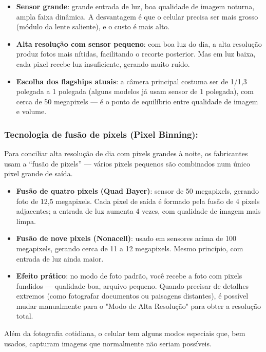 \begin{itemize}
  \item \textbf{Sensor grande}: grande entrada de luz, boa qualidade de imagem noturna, ampla faixa dinâmica. A desvantagem é que o celular precisa ser mais grosso (módulo da lente saliente), e o custo é mais alto.
  \item \textbf{Alta resolução com sensor pequeno}: com boa luz do dia, a alta resolução produz fotos mais nítidas, facilitando o recorte posterior. Mas em luz baixa, cada pixel recebe luz insuficiente, gerando muito ruído.
  \item \textbf{Escolha dos flagships atuais}: a câmera principal costuma ser de 1/1,3 polegada a 1 polegada (alguns modelos já usam sensor de 1 polegada), com cerca de 50 megapixels — é o ponto de equilíbrio entre qualidade de imagem e volume.
\end{itemize}

\subsubsection*{Tecnologia de fusão de pixels (Pixel Binning):}

Para conciliar alta resolução de dia com pixels grandes à noite, os fabricantes usam a “fusão de pixels” — vários pixels pequenos são combinados num único pixel grande de saída.

\begin{itemize}
  \item \textbf{Fusão de quatro pixels (Quad Bayer)}: sensor de 50 megapixels, gerando foto de 12,5 megapixels. Cada pixel de saída é formado pela fusão de 4 pixels adjacentes; a entrada de luz aumenta 4 vezes, com qualidade de imagem mais limpa.
  \item \textbf{Fusão de nove pixels (Nonacell)}: usado em sensores acima de 100 megapixels, gerando cerca de 11 a 12 megapixels. Mesmo princípio, com entrada de luz ainda maior.
  \item \textbf{Efeito prático}: no modo de foto padrão, você recebe a foto com pixels fundidos — qualidade boa, arquivo pequeno. Quando precisar de detalhes extremos (como fotografar documentos ou paisagens distantes), é possível mudar manualmente para o "Modo de Alta Resolução" para obter a resolução total.
\end{itemize}


Além da fotografia cotidiana, o celular tem alguns modos especiais que, bem usados, capturam imagens que normalmente não seriam possíveis.

